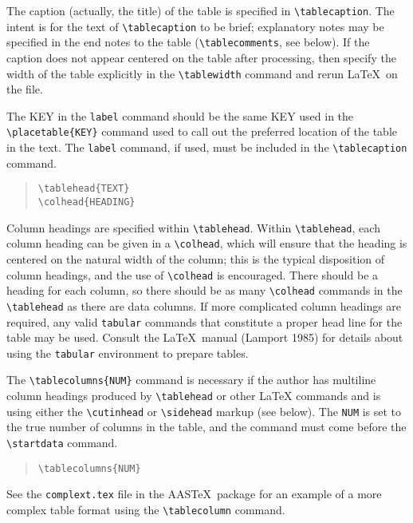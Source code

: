 The caption (actually, the title) of the table is specified
in \verb"\tablecaption".
The intent is for the text of \verb"\tablecaption" to be brief;
explanatory notes may be specified in the end notes to the table
(\verb"\tablecomments", see below).  If the caption does not appear 
centered on the table after processing, then specify the width of 
the table explicitly in the \verb"\tablewidth" command and rerun 
\LaTeX\ on the file.

The {\small KEY} in the {\tt label} command should be the same {\small KEY}
used in
the \verb"\placetable{KEY}" command used to call out the preferred location
of the table in the text.  The {\tt label} command, if used, must be included 
in the \verb"\tablecaption" command.

\begin{quote}
\verb"\tablehead{TEXT}"\\
\verb"\colhead{HEADING}"
\end{quote}

Column headings are specified within \verb"\tablehead".
Within \verb"\tablehead", each column heading can be given
in a \verb"\colhead", which will ensure that the heading is centered
on the natural width of the column; this is the typical disposition
of column headings, and the use of \verb"\colhead" is encouraged.
There should be a heading for each column, so there should be as
many \verb"\colhead" commands in the \verb"\tablehead" as there
are data columns.
If more complicated column headings are required, 
any valid {\tt tabular} commands that constitute a proper
head line for the table may be used.
Consult the \LaTeX\ manual (Lamport 1985) for details about using
the {\tt tabular} environment to prepare tables.

The \verb"\tablecolumns{NUM}" command is necessary if the author has
multiline column headings produced by \verb"\tablehead" or other \LaTeX
commands and is using either the \verb"\cutinhead" or \verb"\sidehead"
markup (see below).  The {\tt NUM} is 
set to the true number of columns in the 
table, and the command must come before the \verb"\startdata" command.

\begin{quote}
\verb"\tablecolumns{NUM}"
\end{quote}
See the {\tt complext.tex} file in the AAS\TeX\ package for an example
of a more complex table format using the \verb"\tablecolumn" command.

